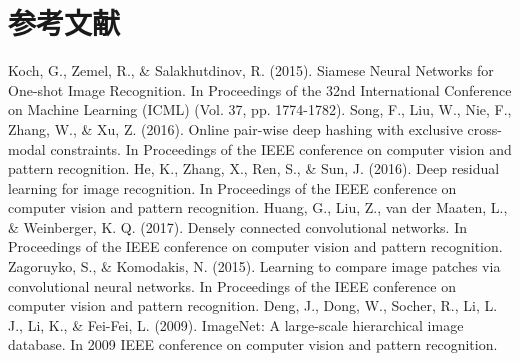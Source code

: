 \documentclass[UTF8]{ctexart}
\begin{document}
\section{参考文献}

\begin{thebibliography}{99}
   Koch, G., Zemel, R., \& Salakhutdinov, R. (2015). Siamese Neural Networks for One-shot Image Recognition. In Proceedings of the 32nd International Conference on Machine Learning (ICML) (Vol. 37, pp. 1774-1782).
   Song, F., Liu, W., Nie, F., Zhang, W., \& Xu, Z. (2016). Online pair-wise deep hashing with exclusive cross-modal constraints. In Proceedings of the IEEE conference on computer vision and pattern recognition.
   He, K., Zhang, X., Ren, S., \& Sun, J. (2016). Deep residual learning for image recognition. In Proceedings of the IEEE conference on computer vision and pattern recognition.
   Huang, G., Liu, Z., van der Maaten, L., \& Weinberger, K. Q. (2017). Densely connected convolutional networks. In Proceedings of the IEEE conference on computer vision and pattern recognition.
   Zagoruyko, S., \& Komodakis, N. (2015). Learning to compare image patches via convolutional neural networks. In Proceedings of the IEEE conference on computer vision and pattern recognition.
   Deng, J., Dong, W., Socher, R., Li, L. J., Li, K., \& Fei-Fei, L. (2009). ImageNet: A large-scale hierarchical image database. In 2009 IEEE conference on computer vision and pattern recognition.
\end{thebibliography}
\end{document}
